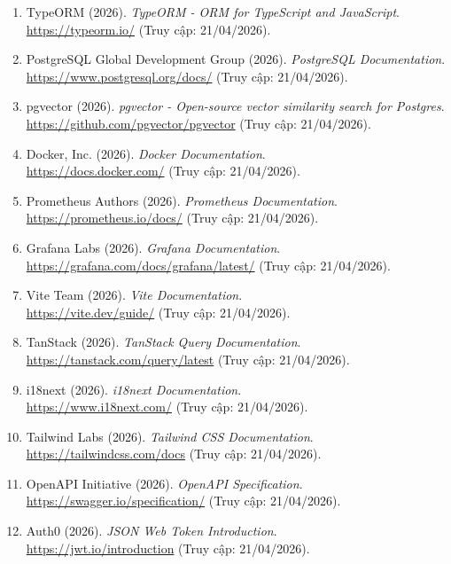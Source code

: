 \begin{enumerate}
	\item TypeORM (2026). \textit{TypeORM - ORM for TypeScript and JavaScript}. \\
	\url{https://typeorm.io/} (Truy cập: 21/04/2026).

	\item PostgreSQL Global Development Group (2026). \textit{PostgreSQL Documentation}. \\
	\url{https://www.postgresql.org/docs/} (Truy cập: 21/04/2026).

	\item pgvector (2026). \textit{pgvector - Open-source vector similarity search for Postgres}. \\
	\url{https://github.com/pgvector/pgvector} (Truy cập: 21/04/2026).

	\item Docker, Inc. (2026). \textit{Docker Documentation}. \\
	\url{https://docs.docker.com/} (Truy cập: 21/04/2026).

	\item Prometheus Authors (2026). \textit{Prometheus Documentation}. \\
	\url{https://prometheus.io/docs/} (Truy cập: 21/04/2026).

	\item Grafana Labs (2026). \textit{Grafana Documentation}. \\
	\url{https://grafana.com/docs/grafana/latest/} (Truy cập: 21/04/2026).

	\item Vite Team (2026). \textit{Vite Documentation}. \\
	\url{https://vite.dev/guide/} (Truy cập: 21/04/2026).

	\item TanStack (2026). \textit{TanStack Query Documentation}. \\
	\url{https://tanstack.com/query/latest} (Truy cập: 21/04/2026).

	\item i18next (2026). \textit{i18next Documentation}. \\
	\url{https://www.i18next.com/} (Truy cập: 21/04/2026).

	\item Tailwind Labs (2026). \textit{Tailwind CSS Documentation}. \\
	\url{https://tailwindcss.com/docs} (Truy cập: 21/04/2026).

	\item OpenAPI Initiative (2026). \textit{OpenAPI Specification}. \\
	\url{https://swagger.io/specification/} (Truy cập: 21/04/2026).

	\item Auth0 (2026). \textit{JSON Web Token Introduction}. \\
	\url{https://jwt.io/introduction} (Truy cập: 21/04/2026).
\end{enumerate}

